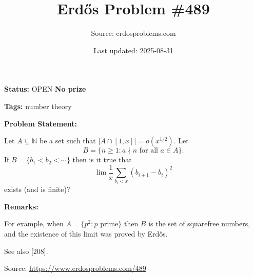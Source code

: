 \documentclass{article}
\title{Erd\H{o}s Problem \#489}
\date{Last updated: 2025-08-31}
\author{Source: erdosproblems.com}
\begin{document}
\maketitle

\noindent\textbf{Status:} OPEN \quad \textbf{No prize}

\noindent\textbf{Tags:} number theory

\medskip
\noindent\textbf{Problem Statement:}

Let $A\subseteq \mathbb{N}$ be a set such that $\lvert A\cap [1,x]\rvert=o(x^{1/2})$. Let\[B=\{ n\geq 1 : a\nmid n\textrm{ for all }a\in A\}.\]If $B=\{b_1<b_2<\cdots\}$ then is it true that\[\lim \frac{1}{x}\sum_{b_i<x}(b_{i+1}-b_i)^2\]exists (and is finite)?

\bigskip
\noindent\textbf{Remarks:}

For example, when $A=\{p^2: p\textrm{ prime}\}$ then $B$ is the set of squarefree numbers, and the existence of this limit was proved by Erd\H{o}s. 

See also [208].

\bigskip
\noindent\small{Source: \url{https://www.erdosproblems.com/489}}
\end{document}
